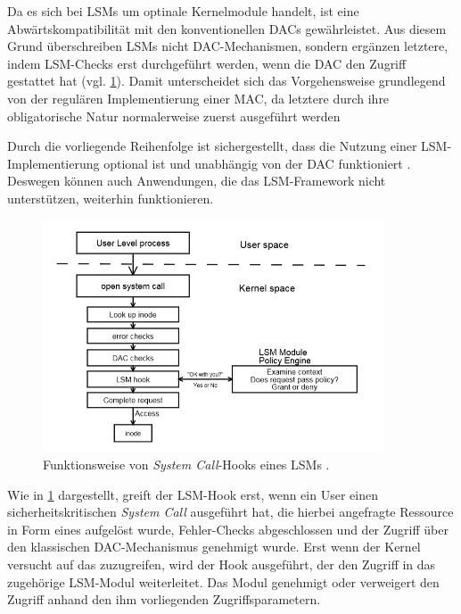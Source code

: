 \documentclass[../main.tex]{subfiles}
\begin{document}
			Da es sich bei LSMs um optinale Kernelmodule handelt, ist eine Abwärtskompatibilität mit den konventionellen DACs gewährleistet.
			Aus diesem Grund überschreiben LSMs nicht DAC-Mechanismen, sondern ergänzen letztere, indem LSM-Checks erst durchgeführt werden, wenn die DAC den Zugriff gestattet hat (vgl. \fig \ref{fig:sec_LSMHook}). Damit unterscheidet sich das Vorgehensweise grundlegend von der regulären Implementierung einer MAC, da letztere durch ihre obligatorische Natur normalerweise zuerst ausgeführt werden \cite[S.3]{LSMFramework}

			Durch die vorliegende Reihenfolge ist sichergestellt, dass die Nutzung einer LSM-Implementierung optional ist und unabhängig von der DAC funktioniert \cite{centOsMCS}. Deswegen können auch Anwendungen, die das LSM-Framework nicht unterstützen, weiterhin funktionieren.

			\begin{figure}[h]
          \centering
          \includegraphics[width=0.9\textwidth]{./images/sec_LSMHook.jpg}
          \caption{Funktionsweise von \emph{System Call}-Hooks eines LSMs \cite[S.3]{LSMFramework}.}
          \label{fig:sec_LSMHook}
      \end{figure}

			Wie in \fig \ref{fig:sec_LSMHook} dargestellt, greift der LSM-Hook erst, wenn ein User einen sicherheitskritischen \emph{System Call} ausgeführt hat, die hierbei angefragte Ressource in Form eines  aufgelöst wurde, Fehler-Checks abgeschlossen und der Zugriff über den klassischen DAC-Mechanismus genehmigt wurde. Erst wenn der Kernel versucht auf das  zuzugreifen, wird der Hook ausgeführt, der den Zugriff in das zugehörige LSM-Modul weiterleitet. Das Modul genehmigt oder verweigert den Zugriff anhand den ihm vorliegenden Zugriffsparametern.
\end{document}
